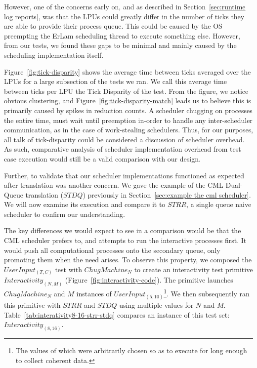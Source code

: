 However,
one of the concerns early on, and as described in Section~\ref{sec:runtime log reports}, 
was that the LPUs could greatly differ in the number of ticks they are able to 
provide their process queue. This could be caused by the OS preempting the 
ErLam scheduling thread to execute something else. However, from our tests, we
found these gaps to be minimal and mainly caused by the scheduling implementation
itself. 

Figure~\ref{fig:tick-disparity} shows the average time between ticks averaged over
the LPUs for a large subsection of the tests we ran. We call this average time 
between ticks per LPU the Tick Disparity of the test. From the figure, we notice
obvious clustering, and Figure~\ref{fig:tick-disparity-match} leads us to believe this
is primarily caused by spikes in reduction counts. A scheduler chugging on 
processes the entire time, must wait until preemption in-order to handle any 
inter-scheduler communication, as in the case of work-stealing schedulers. Thus,
for our purposes, all talk of tick-disparity could be considered a discussion of
scheduler overhead. As such, comparative analysis of scheduler implementation 
overhead from test case execution would still be a valid comparison with our
design.

Further, to validate that our scheduler implementations functioned as expected 
after translation was another concern. We gave the example of the CML 
Dual-Queue translation ($STDQ$) previously in Section~\ref{sec:example the cml scheduler}.
We will now examine its execution and compare it to $STRR$, a single queue naive
scheduler to confirm our understanding.

The key differences we would expect to see in a comparison would be that the CML scheduler
prefers to, and attempts to run the interactive processes first. It would push
all computational processes onto the secondary queue, only promoting them when 
the need arises. To observe this property, we composed the $UserInput_{(T,C)}$ 
test with $ChugMachine_N$ to create an interactivity test primitive 
$Interactivity_{(N,M)}$ (Figure~\ref{fig:interactivity-code}). The primitive
launches $ChugMachine_N$ and $M$ instances of $UserInput_{(5,10)}$\footnote{The values
of which were arbitrarily chosen so as to execute for long enough to collect
coherent data.}. We then subsequently ran this primitive with $STRR$ and $STDQ$
using multiple values for $N$ and $M$. Table~\ref{tab:interativity8-16-strr-stdq}
compares an instance of this test set: $Interactivity_{(8,16)}$.

